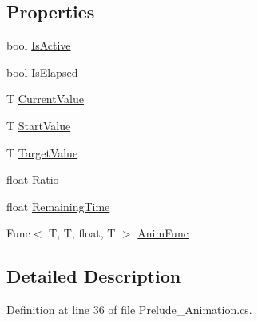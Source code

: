 \subsection*{Properties}
\begin{DoxyCompactItemize}
\item 
bool \hyperlink{class_prelude_1_1_animate_3_01_t_01_4_a2c394b77e45fd05e6d63260dfbdd1a92}{Is\+Active}
\item 
bool \hyperlink{class_prelude_1_1_animate_3_01_t_01_4_a45ee613c6c0487c1d2f4fc605c51c2f6}{Is\+Elapsed}
\item 
T \hyperlink{class_prelude_1_1_animate_3_01_t_01_4_a114a72fd0ef11d6c372321a0b4124b89}{Current\+Value}
\item 
T \hyperlink{class_prelude_1_1_animate_3_01_t_01_4_a295050c7a6a66cd5c07303c6de4488e2}{Start\+Value}
\item 
T \hyperlink{class_prelude_1_1_animate_3_01_t_01_4_a283c75308a7f43c7508125aafed4db86}{Target\+Value}
\item 
float \hyperlink{class_prelude_1_1_animate_3_01_t_01_4_a6d6f38d9e50d753d306ffc886ae4565e}{Ratio}
\item 
float \hyperlink{class_prelude_1_1_animate_3_01_t_01_4_a7406c94b3a721528662898108f5ca5ca}{Remaining\+Time}
\item 
Func$<$ T, T, float, T $>$ \hyperlink{class_prelude_1_1_animate_3_01_t_01_4_a20be9c1557b17e88ad7aa6c0a2c3c518}{Anim\+Func}
\end{DoxyCompactItemize}


\subsection{Detailed Description}


Definition at line 36 of file Prelude\+\_\+\+Animation.\+cs.



